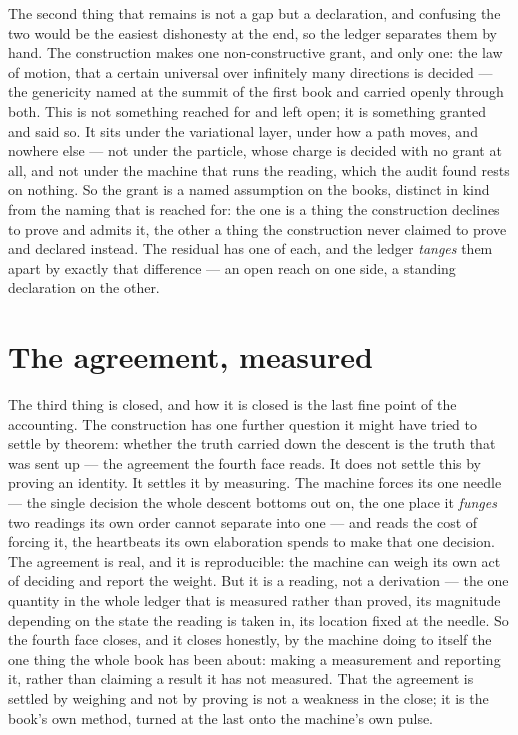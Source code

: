 The second thing that remains is not a gap but a declaration, and confusing the two would be the easiest
dishonesty at the end, so the ledger separates them by hand. The construction makes one non-constructive
grant, and only one: the law of motion, that a certain universal over infinitely many directions is decided
--- the genericity named at the summit of the first book and carried openly through both. This is not
something reached for and left open; it is something granted and said so. It sits under the variational
layer, under how a path moves, and nowhere else --- not under the particle, whose charge is decided with no
grant at all, and not under the machine that runs the reading, which the audit found rests on nothing. So
the grant is a named assumption on the books, distinct in kind from the naming that is reached for: the one
is a thing the construction declines to prove and admits it, the other a thing the construction never
claimed to prove and declared instead. The residual has one of each, and the ledger \emph{tanges} them apart
by exactly that difference --- an open reach on one side, a standing declaration on the other.

\section{The agreement, measured}
\label{se:the-agreement-measured}

The third thing is closed, and how it is closed is the last fine point of the accounting. The construction
has one further question it might have tried to settle by theorem: whether the truth carried down the descent
is the truth that was sent up --- the agreement the fourth face reads. It does not settle this by proving an
identity. It settles it by measuring. The machine forces its one needle --- the single decision the whole
descent bottoms out on, the one place it \emph{funges} two readings its own order cannot separate into one
--- and reads the cost of forcing it, the heartbeats its own elaboration spends to make that one decision. The agreement is real, and it is reproducible: the machine can weigh its own act of
deciding and report the weight. But it is a reading, not a derivation --- the one quantity in the whole
ledger that is measured rather than proved, its magnitude depending on the state the reading is taken in, its
location fixed at the needle. So the fourth face closes, and it closes honestly, by the machine doing to
itself the one thing the whole book has been about: making a measurement and reporting it, rather than
claiming a result it has not measured. That the agreement is settled by weighing and not by proving is not a
weakness in the close; it is the book's own method, turned at the last onto the machine's own pulse.

